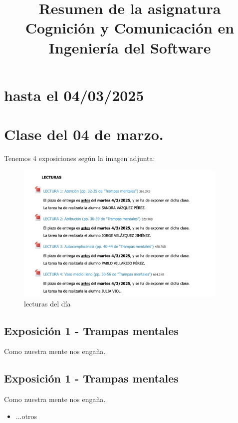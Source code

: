 \documentclass[12pt, a4paper, twoside]{article}
\title{Resumen de la asignatura Cognición y Comunicación en Ingeniería del Software}
\begin{document}
\maketitle

\section{hasta el 04/03/2025}

\section{Clase del 04 de marzo.}
Tenemos 4 exposiciones según la imagen adjunta:
\begin{figure}[h]
    \centering
    \includegraphics[width=0.9\textwidth]{./Images/0304.jpg}
    \caption{lecturas del día}
\end{figure}

\subsection{Exposición 1 - Trampas mentales}
Como nuestra mente nos engaña. \newline

\subsection{Exposición 1 - Trampas mentales}
Como nuestra mente nos engaña. \\
\begin{itemize}https://github.com/CGPerezAranda/Cognici-n-y-comunicaci-n-en-ingenier-a-del-software.git
\item {...otros}
\end{itemize}
\end{document}
